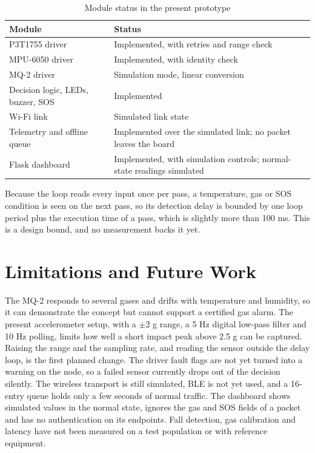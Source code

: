 \documentclass[conference]{IEEEtran}
\begin{document}
\begin{table}[!t]
\caption{Module status in the present prototype}
\label{tab:status}
\centering
\begin{tabular}{|p{1.3in}|p{1.75in}|}
\hline
\textbf{Module} & \textbf{Status} \\
\hline
P3T1755 driver & Implemented, with retries and range check \\
\hline
MPU-6050 driver & Implemented, with identity check \\
\hline
MQ-2 driver & Simulation mode, linear conversion \\
\hline
Decision logic, LEDs, buzzer, SOS & Implemented \\
\hline
Wi-Fi link & Simulated link state \\
\hline
Telemetry and offline queue & Implemented over the simulated link; no packet leaves the board \\
\hline
Flask dashboard & Implemented, with simulation controls; normal-state readings simulated \\
\hline
\end{tabular}
\end{table}

Because the loop reads every input once per pass, a temperature, gas or SOS condition is seen on the next pass, so its detection delay is bounded by one loop period plus the execution time of a pass, which is slightly more than 100 ms. This is a design bound, and no measurement backs it yet. %

\section{Limitations and Future Work}
\label{sec:limits}
The MQ-2 responds to several gases and drifts with temperature and humidity, so it can demonstrate the concept but cannot support a certified gas alarm. The present accelerometer setup, with a $\pm$2 g range, a 5 Hz digital low-pass filter and 10 Hz polling, limits how well a short impact peak above 2.5 g can be captured. Raising the range and the sampling rate, and reading the sensor outside the delay loop, is the first planned change. The driver fault flags are not yet turned into a warning on the node, so a failed sensor currently drops out of the decision silently. The wireless transport is still simulated, BLE is not yet used, and a 16-entry queue holds only a few seconds of normal traffic. The dashboard shows simulated values in the normal state, ignores the gas and SOS fields of a packet and has no authentication on its endpoints. Fall detection, gas calibration and latency have not been measured on a test population or with reference equipment.
\end{document}
